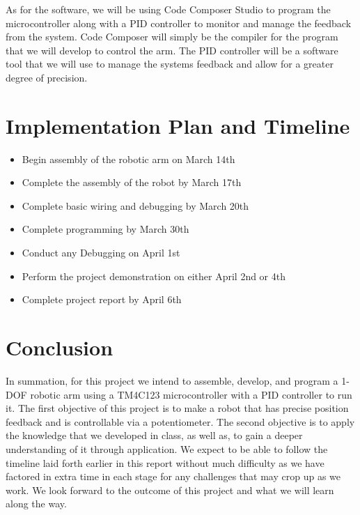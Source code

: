 \documentclass[12pt]{article}
\begin{document}
As for the software, we will be using Code Composer Studio to program the microcontroller along with a PID controller to monitor and manage the feedback from the system. Code Composer will simply be the compiler for the program that we will develop to control the arm. The PID controller will be a software tool that we will use to manage the systems feedback and allow for a greater degree of precision.

\section{Implementation Plan and Timeline}
\begin{itemize}
    \item Begin assembly of the robotic arm on March 14th
    \item Complete the assembly of the robot by March 17th
    \item Complete basic wiring and debugging by March 20th
    \item Complete programming by March 30th
    \item Conduct any Debugging on April 1st
    \item Perform the project demonstration on either April 2nd or 4th
    \item Complete project report by April 6th
\end{itemize}
\section{Conclusion}
In summation, for this project we intend to assemble, develop, and program a 1-DOF robotic arm using a TM4C123 microcontroller with a PID controller to run it. The first objective of this project is to make a robot that has precise position feedback and is controllable via a potentiometer. The second objective is to apply the knowledge that we developed in class, as well as, to gain a deeper understanding of it through application. We expect to be able to follow the timeline laid forth earlier in this report without much difficulty as we have factored in extra time in each stage for any challenges that may crop up as we work. We look forward to the outcome of this project and what we will learn along the way.
\end{document}
